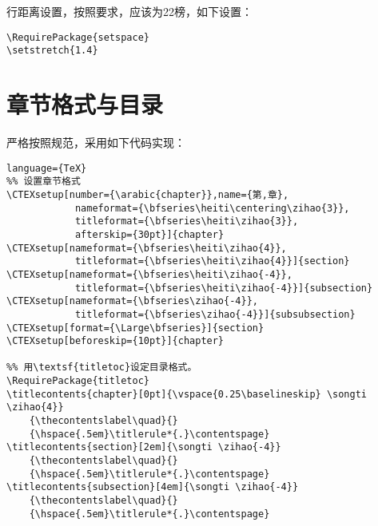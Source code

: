 行距离设置，按照要求，应该为22榜，如下设置：
\begin{lstlisting}[language={[LaTeX]TeX}]
\RequirePackage{setspace}
\setstretch{1.4}
\end{lstlisting}

\section{章节格式与目录}
严格按照规范，采用如下代码实现：
\begin{lstlisting}language={TeX}
%% 设置章节格式
\CTEXsetup[number={\arabic{chapter}},name={第,章},
            nameformat={\bfseries\heiti\centering\zihao{3}},
            titleformat={\bfseries\heiti\zihao{3}},
            afterskip={30pt}]{chapter}
\CTEXsetup[nameformat={\bfseries\heiti\zihao{4}},
            titleformat={\bfseries\heiti\zihao{4}}]{section}
\CTEXsetup[nameformat={\bfseries\heiti\zihao{-4}},
            titleformat={\bfseries\heiti\zihao{-4}}]{subsection}
\CTEXsetup[nameformat={\bfseries\zihao{-4}},
            titleformat={\bfseries\zihao{-4}}]{subsubsection}
\CTEXsetup[format={\Large\bfseries}]{section}
\CTEXsetup[beforeskip={10pt}]{chapter}

%% 用\textsf{titletoc}设定目录格式。
\RequirePackage{titletoc}
\titlecontents{chapter}[0pt]{\vspace{0.25\baselineskip} \songti \zihao{4}}
    {\thecontentslabel\quad}{}
    {\hspace{.5em}\titlerule*{.}\contentspage}
\titlecontents{section}[2em]{\songti \zihao{-4}}
    {\thecontentslabel\quad}{}
    {\hspace{.5em}\titlerule*{.}\contentspage}
\titlecontents{subsection}[4em]{\songti \zihao{-4}}
    {\thecontentslabel\quad}{}
    {\hspace{.5em}\titlerule*{.}\contentspage}
    
\end{lstlisting}

